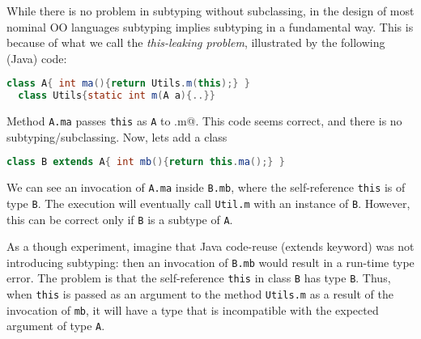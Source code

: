 While there is no problem in subtyping without subclassing, in the design
of most nominal OO languages subtyping implies subtyping in a
fundamental way. This is because of what we call the
\emph{this-leaking problem}, illustrated by the following
(Java) code:

\begin{lstlisting}[language=Java]
  class A{ int ma(){return Utils.m(this);} }
  class Utils{static int m(A a){..}}
\end{lstlisting}

Method \lstinline{A.ma} passes \lstinline{this} as \lstinline{A} to \Q@Util.m@.
This code seems correct, and there is no subtyping/subclassing.
Now, lets add a class \Q@B@

\begin{lstlisting}[language=Java]
  class B extends A{ int mb(){return this.ma();} }  
\end{lstlisting}

We can see an invocation of \lstinline{A.ma} inside
\lstinline{B.mb}, where the self-reference \lstinline{this} is of type \lstinline{B}. 
The execution will eventually call \lstinline{Util.m} with an
instance of \lstinline{B}. However, this can be correct only if \lstinline{B} is a subtype of
\lstinline{A}. 

%
%


As a though experiment, imagine that Java code-reuse (extends keyword) was not introducing subtyping: then an invocation of 
\lstinline{B.mb} would result in a run-time type error.
The problem is that the
self-reference \lstinline{this} in class \lstinline{B} has 
type \lstinline{B}. Thus, when \lstinline{this} is passed as an argument to 
the method \lstinline{Utils.m} as a result of the invocation of
\lstinline{mb}, it will have a type that is incompatible with the
expected argument of type \lstinline{A}.  

